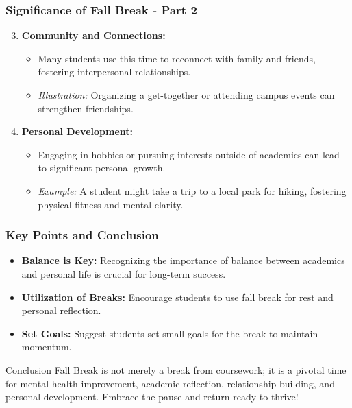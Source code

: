 \documentclass[aspectratio=169]{beamer}
\begin{document}
\begin{frame}[fragile]
    \frametitle{Significance of Fall Break - Part 2}
    \begin{enumerate}
        \setcounter{enumi}{2}
        \item \textbf{Community and Connections:}
        \begin{itemize}
            \item Many students use this time to reconnect with family and friends, fostering interpersonal relationships.
            \item \textit{Illustration:} Organizing a get-together or attending campus events can strengthen friendships.
        \end{itemize}

        \item \textbf{Personal Development:}
        \begin{itemize}
            \item Engaging in hobbies or pursuing interests outside of academics can lead to significant personal growth.
            \item \textit{Example:} A student might take a trip to a local park for hiking, fostering physical fitness and mental clarity.
        \end{itemize}
    \end{enumerate}
\end{frame}

\begin{frame}[fragile]
    \frametitle{Key Points and Conclusion}
    \begin{itemize}
        \item \textbf{Balance is Key:} Recognizing the importance of balance between academics and personal life is crucial for long-term success.
        \item \textbf{Utilization of Breaks:} Encourage students to use fall break for rest and personal reflection.
        \item \textbf{Set Goals:} Suggest students set small goals for the break to maintain momentum.
    \end{itemize}
    
    \begin{block}{Conclusion}
        Fall Break is not merely a break from coursework; it is a pivotal time for mental health improvement, academic reflection, relationship-building, and personal development. Embrace the pause and return ready to thrive!
    \end{block}
\end{frame}
\end{document}
